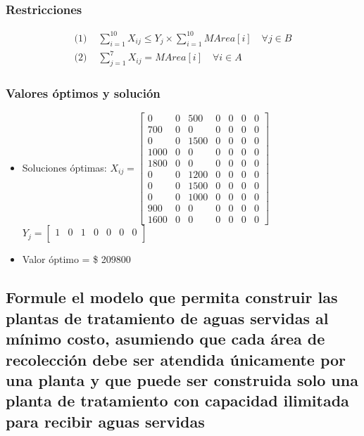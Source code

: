 \documentclass[a4paper,12pt]{article}
\begin{document}
\subsubsection{Restricciones}
\begin{equation*}
\begin{split}
	\text{(1) }& \sum_{i=1}^{10}X_{ij}\leq Y_{j}\times \sum_{i=1}^{10}MArea[i]\quad\forall j\in B\\
	\text{(2) }&\sum_{j=1}^{7}X_{ij}=MArea[i]\quad\forall i\in A
\end{split}
\end{equation*}
\subsubsection{Valores óptimos y solución}
\begin{itemize}
	\item Soluciones óptimas: $X_{ij}=
	\begin{bmatrix}
	0 & 0 & 500 & 0 & 0 & 0 & 0\\
	700 & 0 & 0 & 0 & 0 & 0 & 0\\
	0 & 0 & 1500 & 0 & 0 & 0 & 0\\
	1000 & 0 & 0 & 0 & 0 & 0 & 0\\
	1800 & 0 & 0 & 0 & 0 & 0 & 0\\
	0 & 0 & 1200 & 0 & 0 & 0 & 0\\
	0 & 0 & 1500 & 0 & 0 & 0 & 0\\
	0 & 0 & 1000 & 0 & 0 & 0 & 0\\
	900 & 0 & 0 & 0 & 0 & 0 & 0\\
	1600 & 0 & 0 & 0 & 0 & 0 & 0
	\end{bmatrix}$
	\\
	$Y_{j}=
	\begin{bmatrix}
	1 & 0 & 1 & 0 & 0 & 0 & 0\\
	\end{bmatrix}$
	\item Valor óptimo = \$ 209800
\end{itemize}
\subsection{Formule  el  modelo  que  permita  construir  las  plantas de  tratamiento  de  aguas  servidas  al  mínimo  costo, asumiendo  que  cada  área  de  recolección  debe  ser  atendida  únicamente  por  una  planta  y  que  puede  ser construida solo una planta de tratamiento con capacidad ilimitada para recibir aguas servidas}
\end{document}

